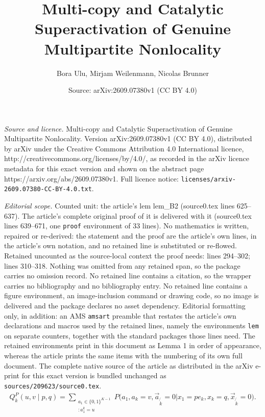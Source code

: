 \documentclass[10pt,a4paper]{amsart}
\title{Multi-copy and Catalytic Superactivation of Genuine Multipartite Nonlocality}
\author{Bora Ulu, Mirjam Weilenmann, Nicolas Brunner}
\date{Source: arXiv:2609.07380v1 (CC BY 4.0)}
\begin{document}
\maketitle

\noindent\emph{Source and licence.} Multi-copy and Catalytic Superactivation of Genuine Multipartite Nonlocality. Version arXiv:2609.07380v1 (CC BY 4.0), distributed by arXiv under the Creative Commons Attribution 4.0 International licence, http://creativecommons.org/licenses/by/4.0/, as recorded in the arXiv licence metadata for this exact version and shown on the abstract page https://arxiv.org/abs/2609.07380v1. Full licence notice: \texttt{licenses/arxiv-2609.07380-CC-BY-4.0.txt}.\par\smallskip

\noindent\textit{Editorial scope.} Counted unit: the article's lem lem\_B2 (source0.tex lines 625--637). The article's complete original proof of it is delivered with it (source0.tex lines 639--671, one \texttt{proof} environment of 33 lines). No mathematics is written, repaired or re-derived: the statement and the proof are the article's own lines, in the article's own notation, and no retained line is substituted or re-flowed.  Retained uncounted as the source-local context the proof needs: lines 294--302; lines 310--318.  Nothing was omitted from any retained span, so the package carries no omission record.  No retained line contains a citation, so the wrapper carries no bibliography and no bibliography entry.  No retained line contains a figure environment, an image-inclusion command or drawing code, so no image is delivered and the package declares no asset dependency.  Editorial formatting only, in addition: an AMS \texttt{amsart} preamble that restates the article's own declarations and macros used by the retained lines, namely the environments \texttt{lem} on separate counters, together with the standard packages those lines need.  The retained environments print in this document as Lemma 1 in order of appearance, whereas the article prints the same items with the numbering of its own full document.  The complete native source of the article as distributed in the arXiv e-print for this exact version is bundled unchanged as \texttt{sources/209623/source0.tex}.
\begin{align}
    Q^P_k(u,v\mid p,q)
=
\sum_{\substack{a_1\in\{0,1\}^{K-1}\\ :a_1^k=u}}
P\Big(
a_1, a_k=v, \vec{a}_{\not {k}}=0
 \Big|
x_1=pe_k, x_k=q, \vec{x}_{\not{k}}=0 \Big). \label{marginals}
\end{align}
\end{document}
